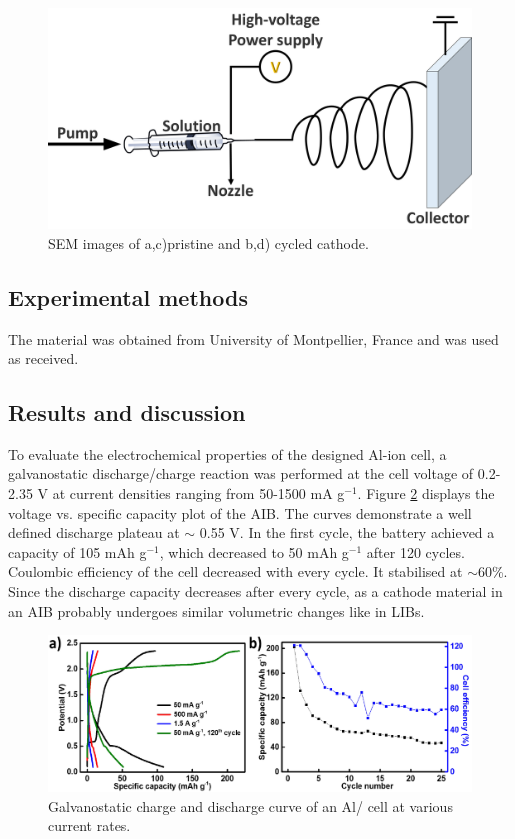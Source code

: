 \begin{figure}[th!]
\centering
\includegraphics[width=\textwidth]{Figures/chap6fig/electrospinning}
\caption{SEM images of a,c)pristine and b,d) cycled  cathode.}
\label{Figures/chap6fig:electrospinning}
\end{figure}

\subsection{Experimental methods}
The material was obtained from University of Montpellier, France and was used as received. 

\subsection{Results and discussion}
To evaluate the electrochemical properties of the designed Al-ion cell, a galvanostatic discharge/charge reaction was performed at the cell voltage of 0.2-2.35 V at current densities ranging from 50-1500 mA g$^{-1}$. Figure \ref{Figures/chap6fig:SnO2perfCDC} displays the voltage vs. specific capacity plot of the AIB. The curves demonstrate a well defined discharge plateau at $\sim$ 0.55 V. In the first cycle, the battery achieved a capacity of 105 mAh g$^{-1}$, which decreased to 50 mAh g$^{-1}$ after 120 cycles. Coulombic efficiency of the cell decreased with every cycle. It stabilised at $\sim$60\%. Since the discharge capacity decreases after every cycle, as a cathode material in an AIB probably undergoes similar volumetric changes like in LIBs.   

 \begin{figure}[th!]
  \centering
  \includegraphics[width=\textwidth]{Figures/chap6fig/SnO2perfCDC.pdf}
    \caption{Galvanostatic charge and discharge curve of an Al/ cell at various current rates.}
  \label{Figures/chap6fig:SnO2perfCDC}
\end{figure}

